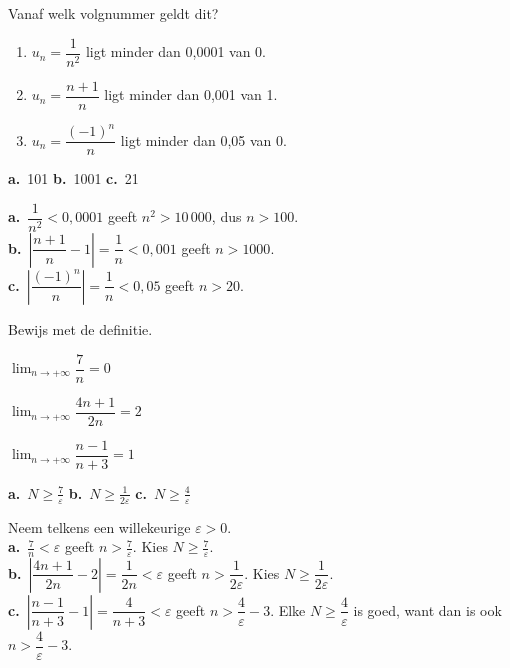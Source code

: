 \begin{oefeningen}
\begin{oefening}[1]\label{oef:h4-epsgetal}
Vanaf welk volgnummer geldt dit?
\begin{enumerate}
  \item $u_n = \dfrac{1}{n^2}$ ligt minder dan 0,0001 van 0.
  \item $u_n = \dfrac{n+1}{n}$ ligt minder dan 0,001 van 1.
  \item $u_n = \dfrac{(-1)^n}{n}$ ligt minder dan 0,05 van 0.
\end{enumerate}
\begin{solution}
\textbf{a.}~101 \quad \textbf{b.}~1001 \quad \textbf{c.}~21
\end{solution}
\begin{fullsolution}
\textbf{a.}~$\dfrac{1}{n^2}<0{,}0001$ geeft $n^2>10\,000$, dus $n>100$.\\
\textbf{b.}~$\left|\dfrac{n+1}{n}-1\right|=\dfrac1n<0{,}001$ geeft $n>1000$.\\
\textbf{c.}~$\left|\dfrac{(-1)^n}{n}\right|=\dfrac1n<0{,}05$ geeft $n>20$.
\end{fullsolution}
\end{oefening}

\begin{oefening}[2]\label{oef:h4-bewijs}
Bewijs met de definitie.
\begin{reeks}
  \item $\displaystyle\lim_{n\to+\infty} \dfrac{7}{n} = 0$
  \item $\displaystyle\lim_{n\to+\infty} \dfrac{4n+1}{2n} = 2$
  \item $\displaystyle\lim_{n\to+\infty} \dfrac{n-1}{n+3} = 1$
\end{reeks}
\begin{solution}
\textbf{a.}~$N\geqslant\tfrac{7}{\varepsilon}$ \quad \textbf{b.}~$N\geqslant\tfrac{1}{2\varepsilon}$ \quad \textbf{c.}~$N\geqslant\tfrac{4}{\varepsilon}$
\end{solution}
\begin{fullsolution}
Neem telkens een willekeurige $\varepsilon>0$.\\
\textbf{a.}~$\tfrac7n<\varepsilon$ geeft $n>\tfrac{7}{\varepsilon}$. Kies $N\geqslant\tfrac{7}{\varepsilon}$.\\
\textbf{b.}~$\left|\dfrac{4n+1}{2n}-2\right|=\dfrac{1}{2n}<\varepsilon$ geeft $n>\dfrac{1}{2\varepsilon}$. Kies $N\geqslant\dfrac{1}{2\varepsilon}$.\\
\textbf{c.}~$\left|\dfrac{n-1}{n+3}-1\right|=\dfrac{4}{n+3}<\varepsilon$ geeft $n>\dfrac{4}{\varepsilon}-3$. Elke $N\geqslant\dfrac{4}{\varepsilon}$ is goed, want dan is ook $n>\dfrac{4}{\varepsilon}-3$.
\end{fullsolution}
\end{oefening}


\end{oefeningen}
